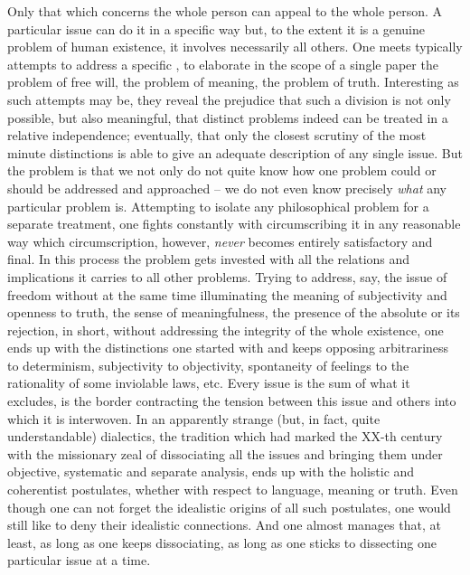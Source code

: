 Only that which concerns the whole person can appeal to the whole person. A
particular issue can do it in a specific way but, to the extent it is a genuine
problem of human existence, it involves necessarily all others.  One meets
typically attempts to address a specific , to
elaborate in the scope of a single paper the problem of free will, the problem
of meaning, the problem of truth.  Interesting as such attempts may be, they reveal the prejudice that
such a division is not only possible, but also meaningful, that distinct
problems indeed can be treated in a relative independence; eventually, that only
the closest scrutiny of the most minute distinctions is able to give an adequate
description of any single issue. But the problem is that we not only do not
quite know how one problem could or should be addressed and approached -- we do
not even know precisely {\em what} any particular problem is. Attempting to
isolate any philosophical problem for a separate treatment, one fights
constantly with circumscribing it in any reasonable way which circumscription,
however, {\em never} becomes entirely satisfactory and final. In this process
the problem gets invested with all the relations and implications it carries to
all other problems. Trying to address, say, the issue of freedom without
at the same time illuminating the meaning of subjectivity and openness to truth,
the sense of meaningfulness, the presence of the absolute or its rejection, in
short, without addressing the integrity of the whole existence, one ends up with
the distinctions one started with and keeps opposing arbitrariness to
determinism, subjectivity to objectivity, spontaneity of feelings to the
rationality of some inviolable laws, etc.  Every issue is the sum of what it
excludes, is the border contracting the tension between this issue and others
into which it is interwoven. In an apparently strange (but, in fact, quite
understandable) dialectics, the tradition which had marked the XX-th century
with the missionary zeal of dissociating all the issues and bringing them under
objective, systematic and separate analysis, ends up with the holistic and
coherentist postulates, whether with respect to language, meaning or
truth. Even though one can not forget the
idealistic origins of all such postulates, one would still like to deny their
idealistic connections. And one almost manages that, at least, as long as one
keeps dissociating, as long as one sticks to dissecting one particular issue at
a time.

